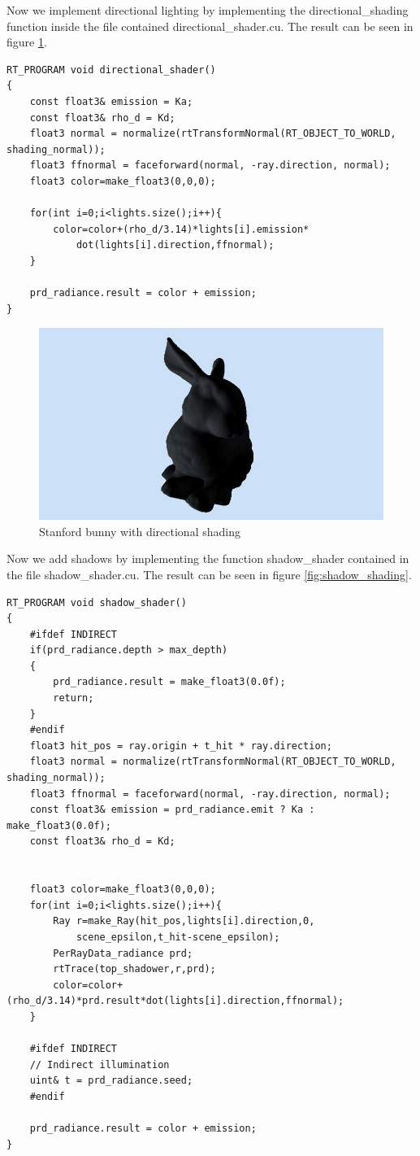 Now we implement directional lighting by implementing the directional\_shading function inside the file contained directional\_shader.cu. The result can be seen in figure \ref{fig:directional_shadow}.
\begin{lstlisting}
RT_PROGRAM void directional_shader() 
{ 
	const float3& emission = Ka;
	const float3& rho_d = Kd;
	float3 normal = normalize(rtTransformNormal(RT_OBJECT_TO_WORLD, shading_normal)); 
	float3 ffnormal = faceforward(normal, -ray.direction, normal); 
	float3 color=make_float3(0,0,0);
	
	for(int i=0;i<lights.size();i++){
		color=color+(rho_d/3.14)*lights[i].emission*
			dot(lights[i].direction,ffnormal);
	}
	
	prd_radiance.result = color + emission; 
}
\end{lstlisting}

\begin{figure}[H]
	\centering
	\includegraphics[scale=\imagescale]{images/project/3}
	\caption{Stanford bunny with directional shading}
	\label{fig:directional_shadow}
\end{figure}
Now we add shadows by implementing the function shadow\_shader contained in the file shadow\_shader.cu. The result can be seen in figure \ref{fig:shadow_shading}.
\begin{lstlisting}
RT_PROGRAM void shadow_shader() 
{ 
	#ifdef INDIRECT
	if(prd_radiance.depth > max_depth)
	{
		prd_radiance.result = make_float3(0.0f);
		return;
	}
	#endif
	float3 hit_pos = ray.origin + t_hit * ray.direction;
	float3 normal = normalize(rtTransformNormal(RT_OBJECT_TO_WORLD, shading_normal)); 
	float3 ffnormal = faceforward(normal, -ray.direction, normal); 
	const float3& emission = prd_radiance.emit ? Ka : make_float3(0.0f);
	const float3& rho_d = Kd;
	
	
	float3 color=make_float3(0,0,0);
	for(int i=0;i<lights.size();i++){
		Ray r=make_Ray(hit_pos,lights[i].direction,0,
			scene_epsilon,t_hit-scene_epsilon);
		PerRayData_radiance prd;
		rtTrace(top_shadower,r,prd);
		color=color+(rho_d/3.14)*prd.result*dot(lights[i].direction,ffnormal);
	}
	
	#ifdef INDIRECT
	// Indirect illumination
	uint& t = prd_radiance.seed;
	#endif
	
	prd_radiance.result = color + emission;
}
\end{lstlisting}

